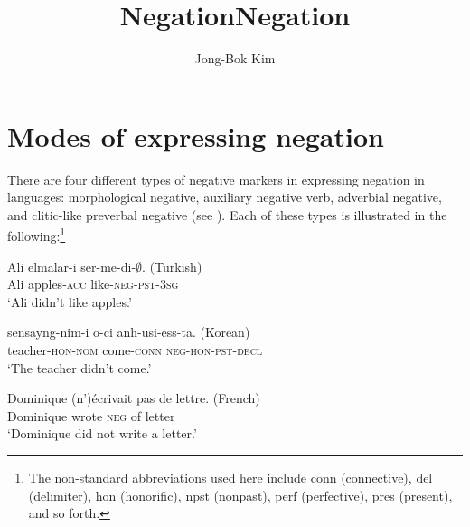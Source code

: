 \documentclass[output=paper
                ,modfonts
                		,nonflat
	        ,collection
	        ,collectionchapter
	        ,collectiontoclongg
 	        ,biblatex
                ,babelshorthands
                ,newtxmath
                ,draftmode
                ,colorlinks, citecolor=brown
]{./langsci/langscibook}
\author{Jong-Bok Kim\affiliation{Kyung Hee University, Seoul}}
\title{Negation}
\title{Negation}
\begin{document}
\maketitle

{

\section{Modes of expressing negation}


There are four different types of negative markers
in expressing negation in languages: morphological negative,
auxiliary negative verb, adverbial negative, and clitic-like
 preverbal negative (see \citealt{Dahl:79, Payne:85, Dryer:05}).
Each of these types is illustrated in the following:\footnote{The non-standard abbreviations
used here include 
 {\sc conn} (connective), 
 {\sc del} (delimiter), {\sc hon} (honorific), 
{\sc npst} (nonpast),  {\sc perf} (perfective), {\sc pres} (present), and so forth.}

\eal
\ex\label{1a}
\gll Ali  elmalar-i  ser-me-di-$\emptyset$. \hfill (Turkish) \\
Ali apples-\textsc{acc}  like-\textsc{neg}-\textsc{pst}-\textsc{3sg} \\
\glt `Ali didn't like apples.'

\ex\label{1b}
\gll sensayng-nim-i o-ci anh-usi-ess-ta.  \hfill (Korean) \\
teacher-\textsc{hon}-\textsc{nom} come-\textsc{conn} \textsc{neg}-\textsc{hon}-\textsc{pst}-\textsc{decl} \\
\glt `The teacher didn't come.'

\ex \label{1c}
\gll Dominique (n')\'{e}crivait pas de lettre. \hfill (French)\\
     Dominique wrote \textsc{neg} of letter \\
\glt `Dominique did not write a letter.'

}
\end{document}
